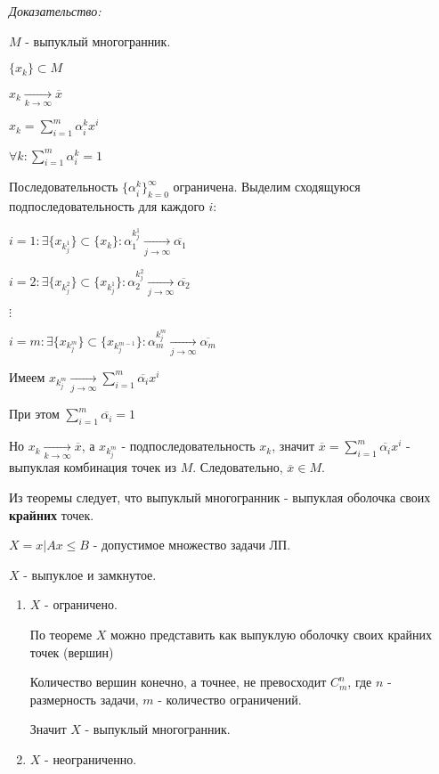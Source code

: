\documentclass[11pt]{article}
\newenvironment{proof}{
  \textit{Доказательство:}
    
  \begin{adjustwidth}{1em}{}
}{
  \end{adjustwidth}
}
\begin{document}
\begin{sloppypar}
\begin{enumerate}
  \begin{proof}
    $M$ - выпуклый многогранник.  
  
    $\{x_k\} \subset M$
    
    $x_k \xrightarrow[k \to \infty]{} \overline{x}$
    
    $x_k = \sum_{i = 1}^m \alpha_i^k x^i$
    
    $\forall k: \sum_{i = 1}^m \alpha_i^k = 1$
    
    Последовательность $\{\alpha_i^k\}_{k = 0}^\infty$ ограничена. Выделим сходящуюся подпоследовательность для каждого $i$:
    
    $i = 1: \exists \{x_{k_j^1}\} \subset \{x_k\}: \alpha_1^{k_j^1} \xrightarrow[j \to \infty]{} \overline{\alpha_1}$
    
    $i = 2: \exists \{x_{k_j^2}\} \subset \{x_{k_j^1}\}: \alpha_2^{k_j^2} \xrightarrow[j \to \infty]{} \overline{\alpha_2}$

    $\vdots$
    
    $i = m: \exists \{x_{k_j^m}\} \subset \{x_{k_j^{m - 1}}\}: \alpha_m^{k_j^m} \xrightarrow[j \to \infty]{} \overline{\alpha_m}$
    
    Имеем $x_{k_j^m} \xrightarrow[j \to \infty]{} \sum_{i = 1}^m \overline{\alpha_i} x^i$
    
    При этом $\sum_{i = 1}^m \overline{\alpha_i} = 1$
    
    Но $x_k \xrightarrow[k \to \infty]{} \overline{x}$, а $x_{k_j^m}$ - подпоследовательность $x_k$, значит $\overline{x} =  \sum_{i = 1}^m \overline{\alpha_i} x^i$ - выпуклая комбинация точек из $M$. Следовательно, $\overline{x} \in M$.
  \end{proof}
\end{enumerate}

Из теоремы следует, что выпуклый многогранник - выпуклая оболочка своих \textbf{крайних} точек.

$X = {x | Ax \leq B}$ - допустимое множество задачи ЛП.

$X$ - выпуклое и замкнутое.

\begin{enumerate}
  \item $X$ - ограничено.
  
  По теореме $X$ можно представить как выпуклую оболочку своих крайних точек (вершин)
  
  Количество вершин конечно, а точнее, не превосходит $C_m^n$, где $n$ - размерность задачи, $m$ - количество ограничений.
  
  Значит $X$ - выпуклый многогранник.
  \item $X$ - неограниченно.
  

\end{enumerate}
\end{sloppypar}
\end{document}
